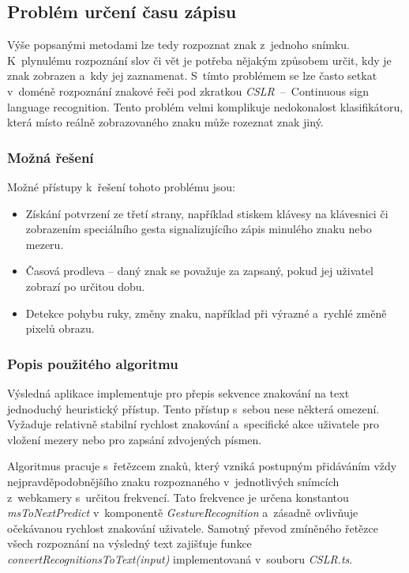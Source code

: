 \documentclass[
  master,
  program=ainfvs,
  biblatex,
  figures=true,
  tables=false,
  sourcecodes=true,
  glossaries,
  index
]{kidiplom}
\begin{document}
            
    
   \subsection{Problém určení času zápisu} \label{cslr-text}
        Výše popsanými metodami lze tedy rozpoznat znak z~jednoho snímku. K~plynulému rozpoznání slov či vět je potřeba nějakým způsobem určit, kdy je znak zobrazen a~kdy jej zaznamenat. S~tímto problémem se lze často setkat v~doméně rozpoznání znakové řeči pod zkratkou \emph{CSLR}~--~Continuous sign language recognition. Tento problém velmi komplikuje nedokonalost klasifikátoru, která místo reálně zobrazovaného znaku může rozeznat znak jiný.

        \subsubsection{Možná řešení}
            Možné přístupy k~řešení tohoto problému jsou:
            \begin{itemize}
                \item Získání potvrzení ze třetí strany, například stiskem klávesy na klávesnici či zobrazením speciálního gesta signalizujícího zápis minulého znaku nebo mezeru.
                \item Časová prodleva -- daný znak se považuje za zapsaný, pokud jej uživatel zobrazí po určitou dobu.
                \item Detekce pohybu ruky, změny znaku, například při výrazné a~rychlé změně pixelů obrazu.
            \end{itemize}


    \subsubsection{Popis použitého algoritmu}
        Výsledná aplikace implementuje pro přepis sekvence znakování na text jednoduchý heuristický přístup. Tento přístup s~sebou nese některá omezení. Vyžaduje relativně stabilní rychlost znakování a~specifické akce uživatele pro vložení mezery nebo pro zapsání zdvojených písmen.

        Algoritmus pracuje s~řetězcem znaků, který vzniká postupným přidáváním vždy nejpravděpodobnějšího znaku rozpoznaného v~jednotlivých snímcích z~webkamery s~určitou frekvencí. Tato frekvence je určena konstantou \emph{msToNextPredict} v~komponentě \emph{GestureRecognition} a~zásadně ovlivňuje očekávanou rychlost znakování uživatele. Samotný převod zmíněného řetězce všech rozpoznání na výsledný text zajišťuje funkce \emph{convertRecognitionsToText(input)} implementovaná v~souboru \emph{CSLR.ts}.
\end{document}
